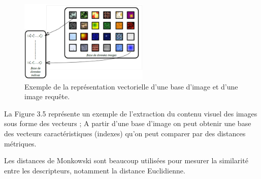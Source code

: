 \begin{figure}[H]
	\centering
	\includegraphics[width=0.55\textwidth]{Figures/horsligne.png} %
	\caption{Exemple de la représentation vectorielle d'une base d'image et d'une image requête.}
\end{figure}
La Figure 3.5 représente un exemple de l’extraction du contenu visuel des images sous forme des vecteurs ; A partir d’une base d’image on peut obtenir une base des vecteurs caractéristiques (indexes) qu’on peut comparer par des distances métriques.

Les distances de Monkowski sont beaucoup utilisées pour mesurer la similarité entre les descripteurs, notamment la distance Euclidienne. 

%
%

